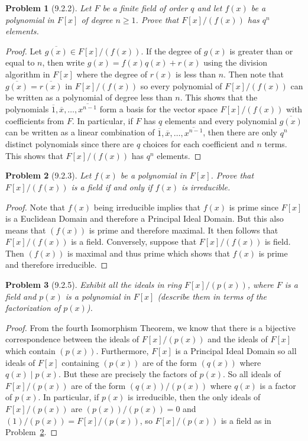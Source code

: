 \documentclass{article}
\newtheorem{problem}{Problem}
\begin{document}
\begin{problem}[9.2.2]
Let $F$ be a finite field of order $q$ and let $f(x)$ be a polynomial in $F[x]$ of degree $n \geq 1$. Prove that $F[x]/(f(x))$ has $q^n$ elements.
\end{problem}
\begin{proof}
Let $\overline{g(x)} \in F[x]/(f(x))$. If the degree of $g(x)$ is greater than or equal to $n$, then write $g(x) = f(x)q(x) + r(x)$ using the division algorithm in $F[x]$ where the degree of $r(x)$ is less than $n$. Then note that $\overline{g(x)} = \overline{r(x)}$ in $F[x]/(f(x))$ so every polynomial of $F[x]/(f(x))$ can be written as a polynomial of degree less than $n$. This shows that the polynomials $\overline{1}, \overline{x}, \dots , \overline{x^{n-1}}$ form a basis for the vector space $F[x]/(f(x))$ with coefficients from $F$. In particular, if $F$ has $q$ elements and every polynomial $\overline{g(x)}$ can be written as a linear combination of $\overline{1}, \overline{x}, \dots , \overline{x^{n-1}}$, then there are only $q^n$ distinct polynomials since there are $q$ choices for each coefficient and $n$ terms. This shows that $F[x]/(f(x))$ has $q^n$ elements.
\end{proof}

\begin{problem}[9.2.3]
\label{field}
Let $f(x)$ be a polynomial in $F[x]$. Prove that $F[x]/(f(x))$ is a field if and only if $f(x)$ is irreducible.
\end{problem}
\begin{proof}
Note that $f(x)$ being irreducible implies that $f(x)$ is prime since $F[x]$ is a Euclidean Domain and therefore a Principal Ideal Domain. But this also means that $(f(x))$ is prime and therefore maximal. It then follows that $F[x]/(f(x))$ is a field. Conversely, suppose that $F[x]/(f(x))$ is field. Then $(f(x))$ is maximal and thus prime which shows that $f(x)$ is prime and therefore irreducible.
\end{proof}

\begin{problem}[9.2.5]
Exhibit \emph{all} the ideals in ring $F[x]/(p(x))$, where $F$ is a field and $p(x)$ is a polynomial in $F[x]$ (describe them in terms of the factorization of $p(x)$).
\end{problem}
\begin{proof}
From the fourth Isomorphism Theorem, we know that there is a bijective correspondence between the ideals of $F[x]/(p(x))$ and the ideals of $F[x]$ which contain $(p(x))$. Furthermore, $F[x]$ is a Principal Ideal Domain so all ideals of $F[x]$ containing $(p(x))$ are of the form $(q(x))$ where $q(x) \mid p(x)$. But these are precisely the factors of $p(x)$. So all ideals of $F[x]/(p(x))$ are of the form $(q(x))/(p(x))$ where $q(x)$ is a factor of $p(x)$. In particular, if $p(x)$ is irreducible, then the only ideals of $F[x]/(p(x))$ are $(p(x))/(p(x)) = 0$ and $(1)/(p(x)) = F[x]/(p(x))$, so $F[x]/(p(x))$ is a field as in Problem~\ref{field}.
\end{proof}
\end{document}
